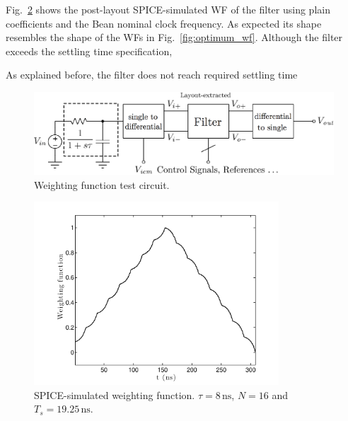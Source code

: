 Fig.~\ref{fig:sim_wf} shows the post-layout SPICE-simulated WF of the filter using plain coefficients and the Bean nominal clock frequency. As expected its shape resembles the shape of the WFs in Fig.~\ref{fig:optimum_wf}. Although the filter exceeds the settling time specification, 

 As explained before, the filter does not reach required settling time 

\begin{figure}[!t]
	\centering
	\includegraphics[width=5in]{./Test/wf_test_circuit}
	\caption{Weighting function test circuit.}\label{fig:wf_test_circuit}
\end{figure}

\begin{figure}[!t]
	\centering
	\includegraphics[width=3.6in]{./Test/sim_wf}
	\caption{SPICE-simulated weighting function. $\tau=8\,\text{ns}$, $N=16$ and $T_s=19.25\,\text{ns}$.}\label{fig:sim_wf}
\end{figure}

